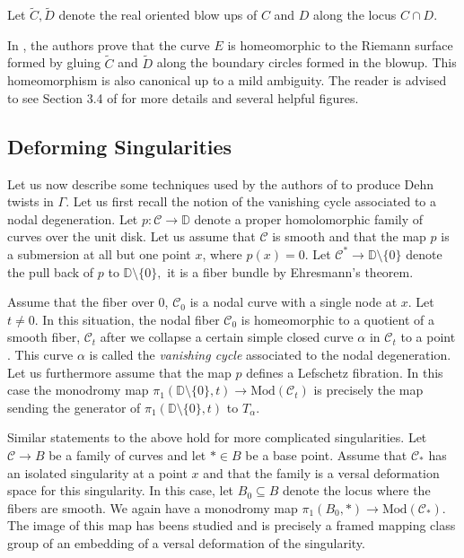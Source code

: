 \documentclass{article}
\newcommand{\DD}{\mathbb{D}}
\newcommand{\CCa}{\mathcal{C}}
\newcommand{\Mod}{\textrm{Mod}}
\begin{document}
Let $\tilde C, \tilde D$ denote the real oriented blow ups of $C$ and $D$ along the locus $C \cap D.$

In \cite{BS}, the authors prove that the curve $E$ is homeomorphic to the Riemann surface formed by gluing $\tilde C $ and $\tilde D$ along the boundary circles formed in the blowup. This homeomorphism is also canonical up to a mild ambiguity. The reader is advised to see Section 3.4 of \cite{BS} for more details and several helpful figures. 

\subsection{Deforming Singularities}
Let us now describe some techniques used by the authors of \cite{BS} to produce Dehn twists in $\Gamma.$ Let us first recall the notion of the vanishing cycle associated to a nodal degeneration. Let $p:\CCa \to \DD$ denote a proper homolomorphic family of curves over the unit disk. Let us assume that $\CCa$ is smooth and that the map $p$ is a submersion at all but one point $x$, where $p(x) =0$. Let $\CCa^* \to \DD \setminus\{0\}$ denote the pull back of $p$ to $\DD \setminus \{0\},$ it is a fiber bundle by Ehresmann's theorem. 

Assume that the fiber over $0$, $\CCa_0$  is a nodal curve with a single node at $x$. Let $t \neq 0.$  In this situation, the nodal fiber $\CCa_0$ is homeomorphic to a quotient of a smooth fiber, $\CCa_t$ after we collapse a certain simple closed curve $\alpha$ in $\CCa_t$ to a point . This curve $\alpha$ is called the \emph{vanishing cycle} associated to the nodal degeneration. Let us furthermore assume that the map $p$ defines a Lefschetz fibration. In this case the monodromy  map $\pi_1(\DD \setminus\{0\},t) \to \Mod(\CCa_t)$ is precisely the map sending the generator of $\pi_1(\DD \setminus\{0\},t)$ to $T_{\alpha}$. 

Similar statements to the above hold for more complicated singularities. Let  $\CCa \to B$ be a family of curves and let $* \in B$ be a base point. Assume that $\CCa_*$ has an isolated singularity at a point $x$ and that the family is a versal deformation space for this singularity. In this case, let $B_0 \subseteq B$ denote the locus where the fibers are smooth. We again have a monodromy map $\pi_1(B_0, *) \to \Mod(\CCa_*).$ The image of this map has beens studied \cite{PCS} and is precisely a framed mapping class group of an embedding of a versal deformation of the singularity.
\end{document}
